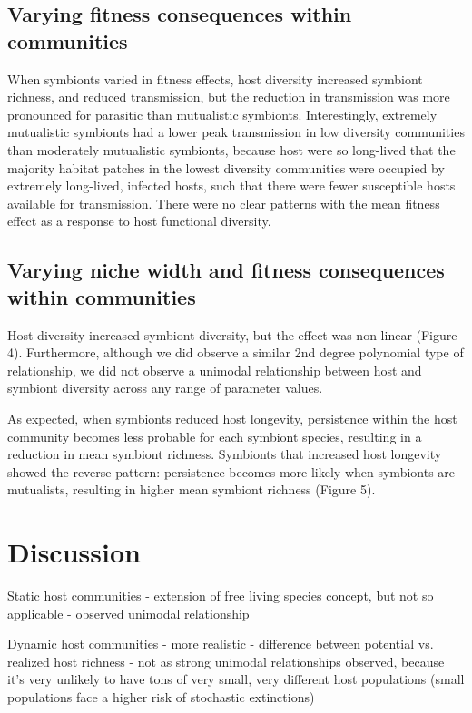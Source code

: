 \documentclass[12pt]{article}
\begin{document}
\subsection*{Varying fitness consequences within communities}

When symbionts varied in fitness effects, host diversity increased symbiont richness, and reduced transmission, but the reduction in transmission was more pronounced for parasitic than mutualistic symbionts. 
Interestingly, extremely mutualistic symbionts had a lower peak transmission in low diversity communities than moderately mutualistic symbionts, because host were so long-lived that the majority habitat patches in the lowest diversity communities were occupied by extremely long-lived, infected hosts, such that there were fewer susceptible hosts available for transmission. 
There were no clear patterns with the mean fitness effect as a response to host functional diversity. 

\subsection*{Varying niche width and fitness consequences within communities}

Host diversity increased symbiont diversity, but the effect was non-linear (Figure 4). 
Furthermore, although we did observe a similar 2nd degree polynomial type of relationship, we did not observe a unimodal relationship between host and symbiont diversity across any range of parameter values. 

As expected, when symbionts reduced host longevity, persistence within the host community becomes less probable for each symbiont species, resulting in a reduction in mean symbiont richness. 
Symbionts that increased host longevity showed the reverse pattern: persistence becomes more likely when symbionts are mutualists, resulting in higher mean symbiont richness (Figure 5). 

\section*{Discussion}

Static host communities 
- extension of free living species concept, but not so applicable
- observed unimodal relationship

Dynamic host communities
- more realistic
- difference between potential vs. realized host richness
- not as strong unimodal relationships observed, because it's very unlikely to have tons of very small, very different host populations (small populations face a higher risk of stochastic extinctions)
\end{document}
